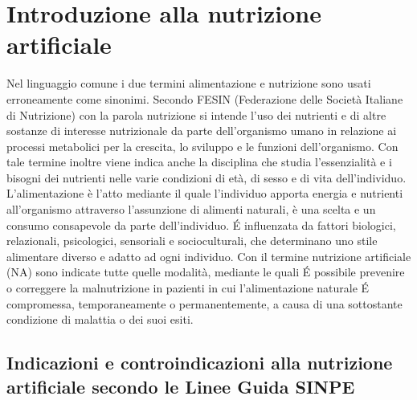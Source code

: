 \documentclass[11pt,a4paper,oneside]{book}
\begin{document}


\chapter{Introduzione alla nutrizione artificiale}
\label{sec:IntroduzioneAllaNutrizioneArtificiale}

Nel linguaggio comune i due termini alimentazione e nutrizione sono usati erroneamente come sinonimi. Secondo FESIN (Federazione delle Societ\`a Italiane di Nutrizione) con la parola nutrizione si intende l'uso dei nutrienti e di altre sostanze di interesse nutrizionale da parte dell'organismo umano in relazione ai processi metabolici per la crescita, lo sviluppo e le funzioni dell'organismo. Con tale termine inoltre viene indica anche la disciplina che studia l'essenzialit\`a e i bisogni dei nutrienti nelle varie condizioni di et\`a, di sesso e di vita dell'individuo. 
L'alimentazione \`e l'atto mediante il quale l'individuo apporta energia e nutrienti all'organismo attraverso l'assunzione di alimenti naturali, \`e una scelta e un consumo consapevole da parte dell'individuo. \'E influenzata da fattori biologici, relazionali, psicologici, sensoriali e socioculturali, che determinano uno stile alimentare diverso e adatto ad ogni individuo. 
Con il termine nutrizione artificiale (NA) sono indicate tutte quelle modalit\`a, mediante le quali \'E possibile prevenire o correggere la malnutrizione in pazienti in cui l'alimentazione naturale \'E compromessa, temporaneamente o permanentemente, a causa di una sottostante condizione di malattia o dei suoi esiti. 


\section{Indicazioni e controindicazioni alla nutrizione artificiale secondo le Linee Guida SINPE}
\end{document}
